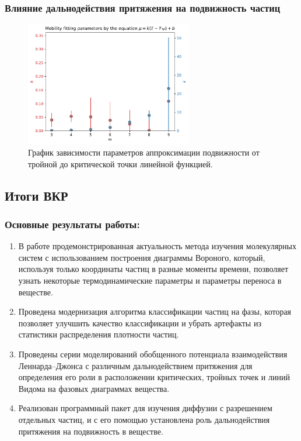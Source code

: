 \documentclass[pdf,hyperref={unicode}]{beamer}
\begin{document}
\begin{frame}
\transdissolve[duration=0.2]
\frametitle{Влияние дальнодействия притяжения на подвижность частиц}

\begin{figure}[h]
\begin{center}
\includegraphics[width=0.65\textwidth]{mobility_fitting_factors}
\caption{\tiny График зависимости параметров аппроксимации подвижности от тройной до критической точки линейной функцией.}
\label{risFittingFactors}
\end{center}
\end{figure}

\end{frame}





\subsection{Итоги ВКР}


\begin{frame}
	\transdissolve[duration=0.2]
	\frametitle{Основные результаты работы:}
	\footnotesize{
\begin{enumerate}
    \item В работе продемонстрированная актуальность метода изучения молекулярных систем с использованием построения диаграммы Вороного, который, используя только координаты частиц в разные моменты времени, позволяет узнать некоторые термодинамические параметры и параметры переноса в веществе.
    \item Проведена модернизация алгоритма классификации частиц на фазы, которая позволяет улучшить качество классификации и убрать артефакты из статистики распределения плотности частиц.
    \item Проведены серии моделирований обобщенного потенциала взаимодействия Леннарда--Джонса с различным дальнодействием притяжения для определения его роли в расположении критических, тройных точек и линий Видома на фазовых диаграммах вещества. 
    \item Реализован программный пакет для изучения диффузии с разрешением отдельных частиц, и с его помощью установлена роль дальнодействия притяжения на подвижность в веществе. 
\end{enumerate}
	}
\end{frame}
\end{document}
